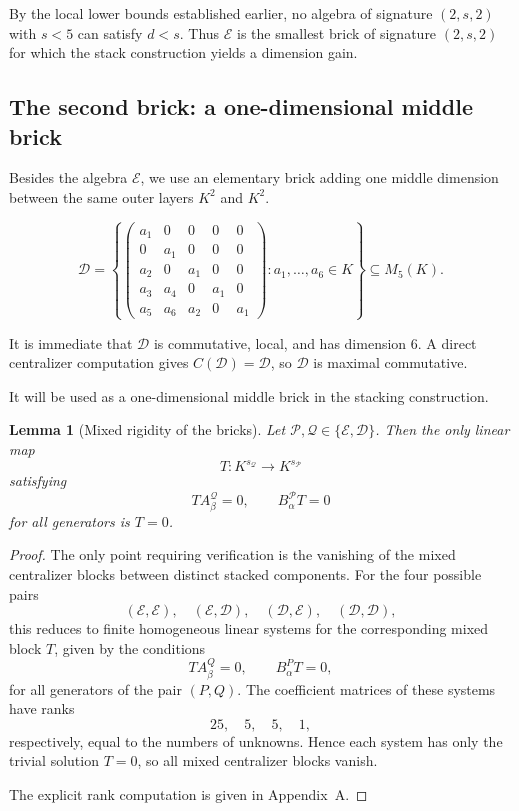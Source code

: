 \documentclass[11pt]{article}
\theoremstyle{remark}
\theoremstyle{plain}
\newtheorem{lemma}[theorem]{Lemma}
\theoremstyle{definition}
\theoremstyle{myremark}
\begin{document}
By the local lower bounds established earlier, no algebra of signature
$(2,s,2)$ with $s<5$ can satisfy $d<s.$ Thus $\mathcal{E}$ is the smallest brick of signature \((2,s,2)\) for which the stack construction yields a dimension gain.

\subsection{The second brick: a one-dimensional middle brick}

Besides the algebra \(\mathcal E\), we use an elementary brick adding one
middle dimension between the same outer layers \(K^2\) and \(K^2\). 

\[
\mathcal D=
\left\{
\begin{pmatrix}
	a_1&0&0&0&0\\
	0&a_1&0&0&0\\
	a_2&0&a_1&0&0\\
	a_3&a_4&0&a_1&0\\
	a_5&a_6&a_2&0&a_1
\end{pmatrix}
: a_1,\dots,a_6\in K
\right\}
\subseteq M_5(K).
\]

It is immediate that \(\mathcal D\) is commutative, local, and has dimension
\(6\). A direct centralizer computation gives \(C(\mathcal D)=\mathcal D\),
so \(\mathcal D\) is maximal commutative.

It will be used as a one-dimensional middle brick in the stacking construction.




\begin{lemma}[Mixed rigidity of the bricks]\label{mixed_rigidity}
	Let \(\mathcal P,\mathcal Q\in\{\mathcal E,\mathcal D\}\).
	Then the only linear map
	\[
	T:K^{s_{\mathcal Q}}\to K^{s_{\mathcal P}}
	\]
	satisfying
	\[
	T A_\beta^{\mathcal Q}=0,
	\qquad
	B_\alpha^{\mathcal P}T=0
	\]
	for all generators is \(T=0\).
\end{lemma}

\begin{proof}
	The only point requiring verification is the vanishing of the mixed
	centralizer blocks between distinct stacked components.	For the four possible pairs
	\[
	(\mathcal E,\mathcal E),\quad
	(\mathcal E,\mathcal D),\quad
	(\mathcal D,\mathcal E),\quad
	(\mathcal D,\mathcal D),
	\]
	this reduces to finite homogeneous linear systems for the corresponding
	mixed block \(T\), given by the conditions
	\[
	T A_\beta^{Q}=0,
	\qquad
	B_\alpha^{P}T=0,
	\]
	for all generators of the pair \((P,Q)\).	
	The coefficient matrices of these systems have ranks
	\[
	25,\quad 5,\quad 5,\quad 1,
	\]
	respectively, equal to the numbers of unknowns. Hence each system has only
	the trivial solution \(T=0\), so all mixed centralizer blocks vanish.
	
	The explicit rank computation is given in Appendix~A.
\end{proof}
\end{document}
